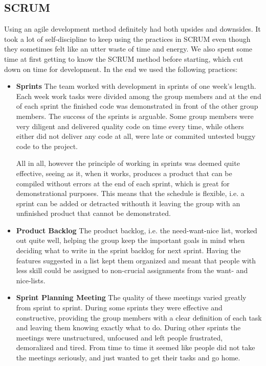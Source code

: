 \subsection{SCRUM}
Using an agile development method definitely had both upsides and downsides. It took a lot of self-discipline to keep using the practices in SCRUM even though they sometimes felt like an utter waste of time and energy. We also spent some time at first getting to know the SCRUM method before starting, which cut down on time for development.
In the end we used the following practices:
\begin{itemize}
	\item \textbf{Sprints} The team worked with development in sprints of one week's length. Each week work tasks were divided
	among the group members and at the end of each sprint the finished code was demonstrated in front of the other group
	members. The success of the sprints is arguable. Some group members were very diligent and delivered quality code on time
	every time, while others either did not deliver any code at all, were late or commited untested buggy code to the project.
	
	All in all, however the principle of working in sprints was deemed quite effective, seeing as it, when it works, produces a
	product that can be compiled without errors at the end of each sprint, which is great for demonstrational purposes. This
	means that the schedule is flexible, i.e. a sprint can be added or detracted withouth it leaving the group with an
	unfinished product that cannot be demonstrated.
	
	\item \textbf{Product Backlog} The product backlog, i.e. the need-want-nice list, worked out quite well, helping the group
	keep the important goals in mind when deciding what to write in the sprint backlog for next sprint. Having the features
	suggested in a list kept them organized and meant that people with less skill could be assigned to non-crucial
	assignments from the want- and nice-lists.
	
	\item \textbf{Sprint Planning Meeting} The quality of these meetings varied greatly from sprint to sprint. During some
	sprints they were effective and constructive, providing the group members with a clear definition of each task and leaving
	them knowing exactly what to do. During other sprints the meetings were unstructured, unfocused and left people frustrated,
	demoralized and tired. From time to time it seemed like people did not take the meetings seriously, and just wanted to get
	their tasks and go home.
	

\end{itemize}
